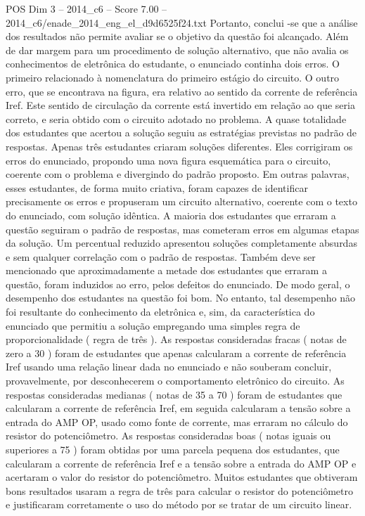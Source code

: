 \begin{textsample}{POS Dim 3 – 2014\_c6 – Score 7.00 – 2014\_c6/enade\_2014\_eng\_el\_d9d6525f24.txt}
Portanto, conclui -se que a análise dos resultados não permite avaliar se o objetivo da questão foi alcançado.
Além de dar margem para um procedimento de solução alternativo, que não avalia os conhecimentos de eletrônica do estudante, o enunciado continha dois erros.
O primeiro relacionado à nomenclatura do primeiro estágio do circuito.
O outro erro, que se encontrava na figura, era relativo ao sentido da corrente de referência Iref.
Este sentido de circulação da corrente está invertido em relação ao que seria correto, e seria obtido com o circuito adotado no problema.
A quase totalidade dos estudantes que acertou a solução seguiu as estratégias previstas no padrão de respostas.
Apenas três estudantes criaram soluções diferentes.
Eles corrigiram os erros do enunciado, propondo uma nova figura esquemática para o circuito, coerente com o problema e divergindo do padrão proposto.
Em outras palavras, esses estudantes, de forma muito criativa, foram capazes de identificar precisamente os erros e propuseram um circuito alternativo, coerente com o texto do enunciado, com solução idêntica.
A maioria dos estudantes que erraram a questão seguiram o padrão de respostas, mas cometeram erros em algumas etapas da solução.
Um percentual reduzido apresentou soluções completamente absurdas e sem qualquer correlação com o padrão de respostas.
Também deve ser mencionado que aproximadamente a metade dos estudantes que erraram a questão, foram induzidos ao erro, pelos defeitos do enunciado.
De modo geral, o desempenho dos estudantes na questão foi bom.
No entanto, tal desempenho não foi resultante do conhecimento da eletrônica e, sim, da característica do enunciado que permitiu a solução empregando uma simples regra de proporcionalidade ( regra de três ).
As respostas consideradas fracas ( notas de zero a 30 ) foram de estudantes que apenas calcularam a corrente de referência Iref usando uma relação linear dada no enunciado e não souberam concluir, provavelmente, por desconhecerem o comportamento eletrônico do circuito.
As respostas consideradas medianas ( notas de 35 a 70 ) foram de estudantes que calcularam a corrente de referência Iref, em seguida calcularam a tensão sobre a entrada do AMP OP, usado como fonte de corrente, mas erraram no cálculo do resistor do potenciômetro.
As respostas consideradas boas ( notas iguais ou superiores a 75 ) foram obtidas por uma parcela pequena dos estudantes, que calcularam a corrente de referência Iref e a tensão sobre a entrada do AMP OP e acertaram o valor do resistor do potenciômetro.
Muitos estudantes que obtiveram bons resultados usaram a regra de três para calcular o resistor do potenciômetro e justificaram corretamente o uso do método por se tratar de um circuito linear.

\end{textsample}

